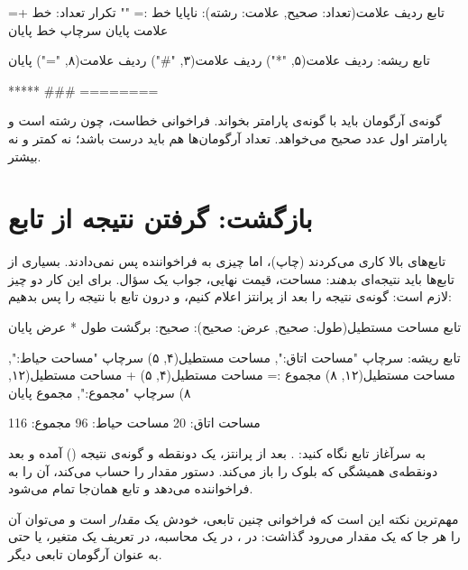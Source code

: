 \begin{salamfa}
تابع ردیف علامت(تعداد: صحیح, علامت: رشته):
    ناپایا خط := ""
    تکرار تعداد:
        خط += علامت
    پایان
    سرچاپ خط
پایان

تابع ریشه:
    ردیف علامت(۵, "*")
    ردیف علامت(۳, "#")
    ردیف علامت(۸, "=")
پایان
\end{salamfa}

\begin{outputfa}
*****
###
========
\end{outputfa}

\begin{warn}
گونه‌ی آرگومان باید با گونه‌ی پارامتر بخواند. فراخوانی 
خطاست، چون  رشته است و پارامتر اول عدد صحیح می‌خواهد. تعداد
آرگومان‌ها هم باید درست باشد؛ نه کمتر و نه بیشتر.
\end{warn}

\section{بازگشت: گرفتن نتیجه از تابع}

تابع‌های بالا کاری می‌کردند (چاپ)، اما چیزی به فراخواننده پس نمی‌دادند.
بسیاری از تابع‌ها باید نتیجه‌ای \emph{بدهند}: مساحت، قیمت نهایی، جواب یک
سؤال. برای این کار دو چیز لازم است: گونه‌ی نتیجه را بعد از پرانتز اعلام
کنیم، و درون تابع با  نتیجه را پس بدهیم:

\begin{salamfa}
تابع مساحت مستطیل(طول: صحیح, عرض: صحیح): صحیح:
    برگشت طول * عرض
پایان

تابع ریشه:
    سرچاپ "مساحت اتاق:", مساحت مستطیل(۴, ۵)
    سرچاپ "مساحت حیاط:", مساحت مستطیل(۱۲, ۸)
    مجموع := مساحت مستطیل(۴, ۵) + مساحت مستطیل(۱۲, ۸)
    سرچاپ "مجموع:", مجموع
پایان
\end{salamfa}

\begin{outputfa}
مساحت اتاق: 20
مساحت حیاط: 96
مجموع: 116
\end{outputfa}

به سرآغاز تابع نگاه کنید:
. بعد از پرانتز، یک دونقطه و گونه‌ی نتیجه () آمده و بعد
دونقطه‌ی همیشگی که بلوک را باز می‌کند. دستور 
مقدار را حساب می‌کند، آن را به فراخواننده می‌دهد و تابع همان‌جا تمام
می‌شود.

مهم‌ترین نکته این است که فراخوانی چنین تابعی، خودش یک \emph{مقدار} است و
می‌توان آن را هر جا که یک مقدار می‌رود گذاشت: در ، در یک
محاسبه، در تعریف یک متغیر، یا حتی به عنوان آرگومان تابعی دیگر.

